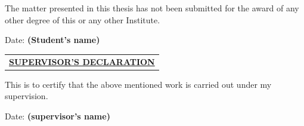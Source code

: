 \noindent
The matter presented in this thesis has not been submitted for the award of any other degree of this or any other Institute. 



\begin{flushright}
Date:  \hfill	\textbf{{(Student's name)} }
\end{flushright}

\begin{center}
\begin{tabular}{ c }
    \centering
	\fontsize{14}{16.8} \bfseries \MakeUppercase{\underline{supervisor's Declaration}}\\
\end{tabular}
\end{center}
This is to certify that the above mentioned work is carried out under my supervision.\\


\begin{flushright}
 Date:  \hfill	\textbf{(supervisor's name)} \\ 
\end{flushright} 







